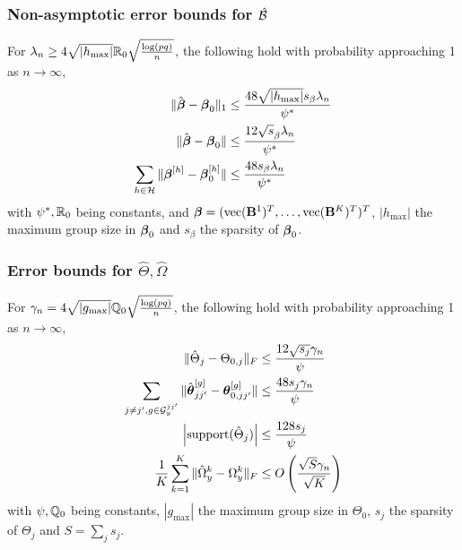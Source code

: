 \documentclass[10pt]{beamer}
\theoremstyle{definition}
\DeclareMathOperator*{\ve}{vec}
\begin{document}

\begin{frame}
\frametitle{Non-asymptotic error bounds for $\hat {{\cal{B}}}$}

For $\lambda_n \geq 4 \sqrt{| h_{\max} |} {\mathbb{R}}_0 \sqrt{ \frac{ \log(pq)}{n}}$, the following hold with probability approaching 1 as $n \rightarrow \infty$,
%
\begin{align*}
\| \hat {{\boldsymbol{\beta}}} - {\boldsymbol{\beta}}_0 \|_1 & \leq \frac{48 \sqrt{ | h_{\max} |} s_\beta \lambda_n}{ \psi^*} \\
\| \hat {{\boldsymbol{\beta}}} - {\boldsymbol{\beta}}_0 \| & \leq \frac{12 \sqrt s_\beta \lambda_n}{ \psi^*} \\
\sum_{h \in {\cal{H}}} \| {\boldsymbol{\beta}}^{[h]} - {\boldsymbol{\beta}}_0^{[h]} \| & \leq \frac{48 s_\beta \lambda_n}{ \psi^*}
\end{align*}
%
with $\psi^*, {\mathbb{R}}_0$ being constants, and $\bfbeta = (\ve(\bfB^1)^T, \ldots, \ve(\bfB^K)^T)^T$, $| h_{\max} |$ the maximum group size in ${\boldsymbol{\beta}}_0$ and $s_\beta$ the sparsity of ${\boldsymbol{\beta}}_0$.
\end{frame}

\begin{frame}
\frametitle{Error bounds for $\hat \Theta, \hat\Omega$}

For $\gamma_n = 4 \sqrt{| g_{\max}|} {\mathbb{Q}}_0 \sqrt{ \frac{ \log(pq)}{n}}$, the following hold with probability approaching 1 as $n \rightarrow \infty$,
%
\begin{align*}
\| \hat \Theta_j - \Theta_{0,j} \|_F & \leq \frac{12 \sqrt{s_j} \gamma_n}{\psi} \\
\sum_{j \neq j', g \in {\cal{G}}_y^{jj'}} \| \hat {{\boldsymbol{\theta}}}_{jj'}^{[g]} - {\boldsymbol{\theta}}_{0,jj'}^{[g]} \| & \leq \frac{48 s_j \gamma_n}{\psi} \\
\left| \text{support} (\hat \Theta_j) \right| & \leq
\frac{128 s_j}{ \psi}\\
\frac{1}{K} \sum_{k=1}^K \| \hat \Omega_y^k - \Omega_y^k \|_F & \leq
O \left( \frac{\sqrt S \gamma_n }{\sqrt K} \right)\\
\end{align*}
%
with $\psi, {\mathbb{Q}}_0$ being constants, $| g_{\max} |$ the maximum group size in $\Theta_0$, $s_j$ the sparsity of $\Theta_j$ and $S = \sum_j s_j$.
\end{frame}

\end{document}
